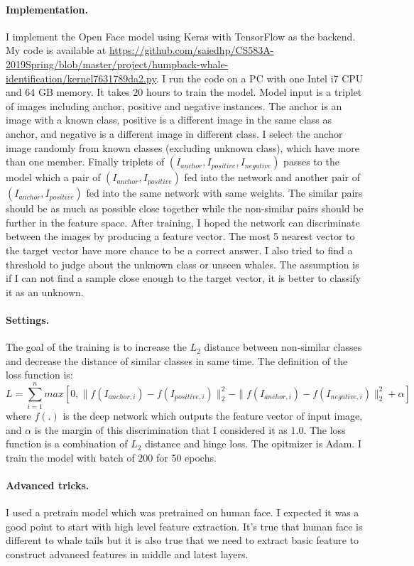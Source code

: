 \documentclass[11pt]{article}
\numberwithin{equation}{section}
\begin{document}
\paragraph{Implementation.}
I implement the Open Face model using Keras with TensorFlow as the backend. 
My code is available at \url{https://github.com/saiedhp/CS583A-2019Spring/blob/master/project/humpback-whale-identification/kernel7631789da2.py}.
I run the code on a PC with one Intel i7 CPU and 64 GB memory.
It takes $20$ hours to train the model.
Model input is a triplet of images including anchor, positive and negative instances. The anchor is an image with a known class, positive is a different image in the same class as anchor, and negative is a different image in different class. I select the anchor image randomly from known classes (excluding unknown class), which have more than one member. Finally triplets of $(I_{anchor}, I_{positive}, I_{negative})$ passes to the model which a pair of  $(I_{anchor}, I_{positive})$ fed into the network and another pair of  $(I_{anchor}, I_{positive})$ fed into the same network with same weights. The similar pairs should be as much as possible close together while the non-similar pairs should be further in the feature space.
After training, I hoped the network can discriminate between the images by producing a feature vector. The most 5 nearest vector to the target vector have more chance to be a correct answer. I also tried to find a threshold to judge about the unknown class or unseen whales. The assumption is if I can not find a sample close enough to the target vector, it is better to classify it as an unknown.


\paragraph{Settings.}
The goal of the training is to increase the $L_2$ distance between non-similar classes and decrease the distance of similar classes in same time. The definition of the loss function is:
$$L=\sum_{i=1}^nmax [ 0, \|f(I_{anchor, i})-f(I_{positive, i})\|_2^2-\|f(I_{anchor, i})-f(I_{negative, i})\|_2^2+\alpha ] $$
 where $f(.)$ is the deep network which outputs the feature vector of input image, and $\alpha$ is the margin of this discrimination that I considered it as $1.0$. 
The loss function is a combination of $L_2$ distance and hinge loss.
The opitmizer is Adam.
I train the model with batch of $200$ for 50 epochs.


\paragraph{Advanced tricks.}
I used a pretrain model which was pretrained on human face. I expected it was a good point to start with high level feature extraction. It's true that human face is different to whale tails but it is also true that we need to extract basic feature to construct advanced features in middle and latest layers. 
\end{document}
